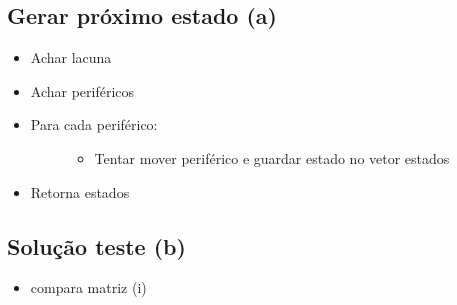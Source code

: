 \documentclass[letterpaper,10pt,openany,oneside,portuges]{sphinxmanual}
\begin{document}
\subsection{Gerar próximo estado (a)}
\label{\detokenize{pseudo:gerar-proximo-estado-a}}\begin{itemize}
\item {} 
Achar lacuna

\item {} 
Achar periféricos

\item {} \begin{description}
\item[{Para cada periférico:}] \leavevmode\begin{itemize}
\item {} 
Tentar mover periférico e guardar estado no vetor estados

\end{itemize}

\end{description}

\item {} 
Retorna estados

\end{itemize}


\subsection{Solução teste (b)}
\label{\detokenize{pseudo:solucao-teste-b}}\begin{itemize}
\item {} 
compara matriz (i)

\end{itemize}

\begin{DUlineblock}{0em}
\item[] 
\item[] 
\end{DUlineblock}
\end{document}
